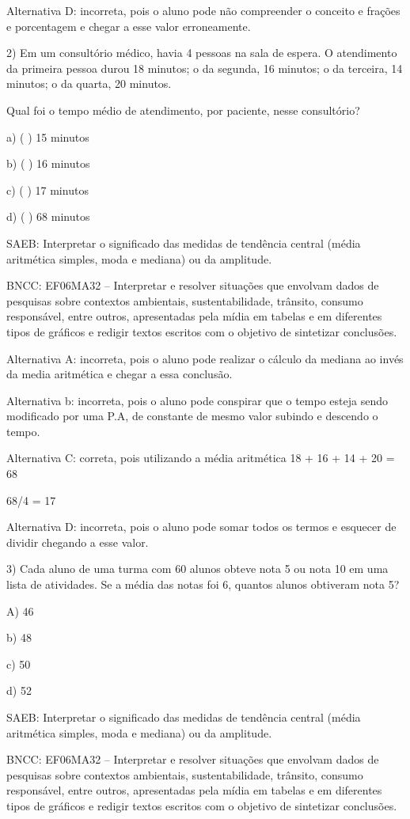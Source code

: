 Alternativa D: incorreta, pois o aluno pode não compreender o conceito e
frações e porcentagem e chegar a esse valor erroneamente.

2) Em um consultório médico, havia 4 pessoas na sala de espera. O
atendimento da primeira pessoa durou 18 minutos; o da segunda, 16
minutos; o da terceira, 14 minutos; o da quarta, 20 minutos.

Qual foi o tempo médio de atendimento, por paciente, nesse consultório?

a) ( ) 15 minutos

b) ( ) 16 minutos

c) ( ) 17 minutos

d) ( ) 68 minutos

SAEB: Interpretar o significado das medidas de tendência central (média
aritmética simples, moda e mediana) ou da amplitude.

BNCC: EF06MA32 -- Interpretar e resolver situações que envolvam dados de
pesquisas sobre contextos ambientais, sustentabilidade, trânsito,
consumo responsável, entre outros, apresentadas pela mídia em tabelas e
em diferentes tipos de gráficos e redigir textos escritos com o objetivo
de sintetizar conclusões.

Alternativa A: incorreta, pois o aluno pode realizar o cálculo da
mediana ao invés da media aritmética e chegar a essa conclusão.

Alternativa b: incorreta, pois o aluno pode conspirar que o tempo esteja
sendo modificado por uma P.A, de constante de mesmo valor subindo e
descendo o tempo.

Alternativa C: correta, pois utilizando a média aritmética 18 + 16 + 14
+ 20 = 68

68/4 = 17

Alternativa D: incorreta, pois o aluno pode somar todos os termos e
esquecer de dividir chegando a esse valor.

3) Cada aluno de uma turma com 60 alunos obteve nota 5 ou nota 10 em uma
lista de atividades. Se a média das notas foi 6, quantos alunos
obtiveram nota 5?

A) 46

b) 48

c) 50

d) 52

SAEB: Interpretar o significado das medidas de tendência central (média
aritmética simples, moda e mediana) ou da amplitude.

BNCC: EF06MA32 -- Interpretar e resolver situações que envolvam dados de
pesquisas sobre contextos ambientais, sustentabilidade, trânsito,
consumo responsável, entre outros, apresentadas pela mídia em tabelas e
em diferentes tipos de gráficos e redigir textos escritos com o objetivo
de sintetizar conclusões.

